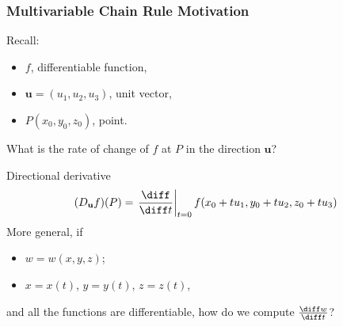 \begin{frame}
  \frametitle{Multivariable Chain Rule Motivation}

Recall:
\begin{itemize}
  \item $f$, differentiable function,
  \item $\textbf{u}=( u_1,u_2,u_3 )$, unit vector,
  \item $P(x_0,y_0,z_0)$, point.
\end{itemize}
%
What is the rate of change of $f$ at $P$ in the direction $\textbf{u}$?

\pause
Directional derivative
%
$$(D_{\textbf{u}}f)(P) = \left. \frac{\diff }{\diff t}\right|_{t=0} f(x_0+tu_1, y_0+tu_2,z_0+tu_3)$$
%
\pause
More general, if
\begin{itemize}
\item $w=w(x,y,z)$;
\item $x=x(t)$, $y=y(t)$, $z=z(t)$,
\end{itemize}
%
and all the functions are differentiable, how do we compute $\frac{\diff w}{\diff t}$?
\end{frame}
